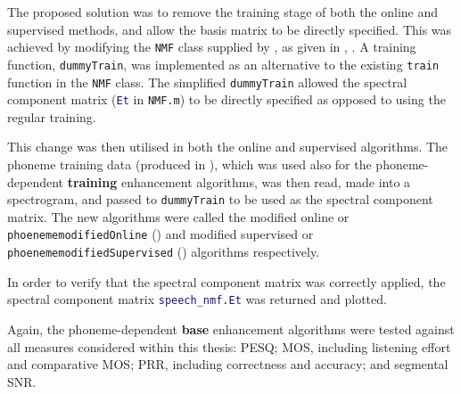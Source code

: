 The proposed solution was to remove the training stage of both the
online and supervised methods, and allow the basis matrix to be directly
specified. This was achieved by modifying the \lstinline[language=bash]!NMF!
class supplied by \citet{mohammadiha2013supervised}, as given in
, \textit{}. A training
function, \lstinline[language=bash]!dummyTrain!, was implemented
as an alternative to the existing \lstinline[language=bash]!train!
function in the \lstinline[language=bash]!NMF! class. The simplified
\lstinline[language=bash]!dummyTrain! allowed the spectral component
matrix (\lstinline[language=Matlab]!Et! in \lstinline[language=bash]!NMF.m!)
to be directly specified as opposed to using the regular training.

This change was then utilised in both the online and supervised algorithms.
The phoneme training data (produced in ),
which was used also for the phoneme-dependent\textbf{ training} enhancement
algorithms, was then read, made into a spectrogram, and passed to
\lstinline[language=bash]!dummyTrain! to be used as the spectral
component matrix. The new algorithms were called the modified online
or \lstinline[language=bash]!phoenememodifiedOnline! ()
and modified supervised or \lstinline[language=bash]!phoenememodifiedSupervised!
() algorithms respectively.

In order to verify that the spectral component matrix was correctly
applied, the spectral component matrix \lstinline[language=Matlab]!speech_nmf.Et!
was returned and plotted.

Again, the phoneme-dependent\textbf{ base} enhancement algorithms
were tested against all measures considered within this thesis: \ac{PESQ};
\ac{MOS}, including listening effort and comparative \ac{MOS}; \ac{PRR},
including correctness and accuracy; and segmental \ac{SNR}.
